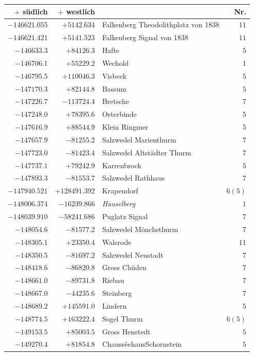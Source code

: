 \clearpage{}%
\begin{center}\begingroup\fontsize{8}{9}\selectfont
\setlength{\tabcolsep}{4pt}
\begin{tabular}{r|r|p{170pt}|r}\hline
\(+\) südlich&\(+\) westlich&&Nr.\\\hline
\(-146621.055\)&\(+5142.634\)&Falkenberg Theodolithplatz von 1838&\(11\)\\
\(-146621.421\)&\(+5141.523\)&Falkenberg Signal von 1838&\(11\)\\
\(-146633.3\)&\(+84126.3\)&Hafte&\(5\)\\
\(-146706.1\)&\(+55229.2\)&Wechold&\(1\)\\
\(-146795.5\)&\(+110046.3\)&Visbeck&\(5\)\\
\(-147170.3\)&\(+82144.8\)&Bassum&\(5\)\\
\(-147226.7\)&\(-113724.4\)&Bretsche&\(7\)\\
\(-147248.0\)&\(+78395.6\)&Osterbinde&\(5\)\\
\(-147616.9\)&\(+88544.9\)&Klein Ringmer&\(5\)\\
\(-147657.9\)&\(-81255.2\)&Salzwedel Marienthurm&\(7\)\\
\(-147723.0\)&\(-81423.4\)&Salzwedel Altstädter Thurm&\(7\)\\
\(-147737.1\)&\(+79242.9\)&Karrenbrock&\(5\)\\
\(-147893.3\)&\(-81553.7\)&Salzwedel Rathhaus&\(7\)\\
\(-147940.521\)&\(+128491.392\)&Krapendorf&\(6 (5)\)\\
\(-148006.374\)&\(-16239.866\)&\textit{Hauselberg}&\(1\)\\
\(-148039.910\)&\(-58241.686\)&Puglatz Signal&\(7\)\\
\(-148054.6\)&\(-81577.2\)&Salzwedel Mönchsthurm&\(7\)\\
\(-148305.1\)&\(+23350.4\)&Walsrode&\(11\)\\
\(-148350.5\)&\(-81697.2\)&Salzwedel Neustadt&\(7\)\\
\(-148418.6\)&\(-86820.8\)&Gross Chüden&\(7\)\\
\(-148661.0\)&\(-89731.8\)&Riebau&\(7\)\\
\(-148667.0\)&\(-44235.6\)&Steinberg&\(7\)\\
\(-148689.2\)&\(+145591.0\)&Lindern&\(5\)\\
\(-148774.5\)&\(+163222.4\)&Sogel Thurm&\(6 (5)\)\\
\(-149153.5\)&\(+85003.5\)&Gross Henstedt&\(5\)\\
\(-149270.4\)&\(+81854.8\)&ChausséehausSchornstein&\(5\)\\

\end{tabular}
\end{center}
